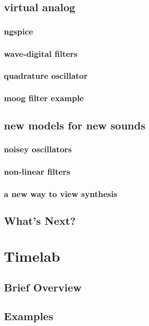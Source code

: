 \documentclass{article}
\begin{document}
\subsection{virtual analog}
\subsubsection{ngspice}
\subsubsection{wave-digital filters}
\subsubsection{quadrature oscillator}
\subsubsection{moog filter example}

\subsection{new models for new sounds}
\subsubsection{noisey oscillators}
\subsubsection{non-linear filters}
\subsubsection{a new way to view synthesis}

\subsection{What's Next?}
\section{Timelab}
\subsection{Brief Overview}
\subsection{Examples}
\end{document}
